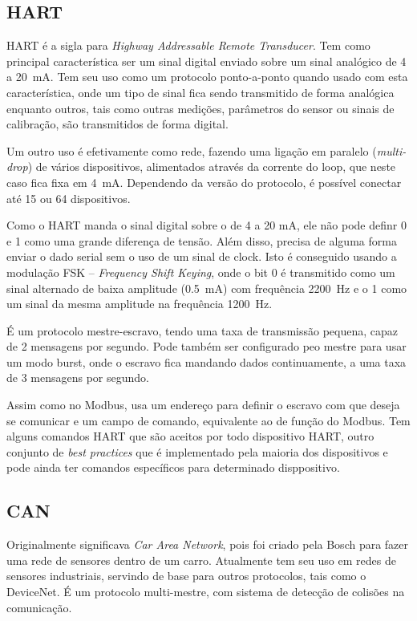 \subsection{HART}
HART é a sigla para \emph{Highway Addressable Remote Transducer}. Tem como principal característica ser um sinal digital enviado sobre um sinal analógico de 4 a \SI{20}{mA}. Tem seu uso como um protocolo ponto-a-ponto quando usado com esta característica, onde um tipo de sinal fica sendo transmitido de forma analógica enquanto outros, tais como outras medições, parâmetros do sensor ou sinais de calibração, são transmitidos de forma digital.

Um outro uso é efetivamente como rede, fazendo uma ligação em paralelo (\emph{multi-drop}) de vários dispositivos, alimentados através da corrente do loop, que neste caso fica fixa em \SI{4}{mA}. Dependendo da versão do protocolo, é possível conectar até 15 ou 64 dispositivos.

Como o HART manda o sinal digital sobre o de 4 a 20 mA, ele não pode definr 0 e 1 como uma grande diferença de tensão. Além disso, precisa de alguma forma enviar o dado serial sem o uso de um sinal de clock. Isto é conseguido usando a modulação FSK -- \emph{Frequency Shift Keying}, onde o bit 0 é transmitido como um sinal alternado de baixa amplitude (\SI{0,5}{mA}) com frequência \SI{2200}{Hz} e o 1 como um sinal da mesma amplitude na frequência \SI{1200}{Hz}.

É um protocolo mestre-escravo, tendo uma taxa de transmissão pequena, capaz de 2 mensagens por segundo. Pode também ser configurado peo mestre para usar um modo burst, onde o escravo fica mandando dados continuamente, a uma taxa de 3 mensagens por segundo.

Assim como no Modbus, usa um endereço para definir o escravo com que deseja se comunicar e um campo de comando, equivalente ao de função do Modbus. Tem alguns comandos HART que são aceitos por todo dispositivo HART, outro conjunto de \emph{best practices} que é implementado pela maioria dos dispositivos e pode ainda ter comandos específicos para determinado disppositivo.

\subsection{CAN}
Originalmente significava \emph{Car Area Network}, pois foi criado pela Bosch para fazer uma rede de sensores dentro de um carro. Atualmente tem seu uso em redes de sensores industriais, servindo de base para outros protocolos, tais como o DeviceNet. É um protocolo multi-mestre, com sistema de detecção de colisões na comunicação.

